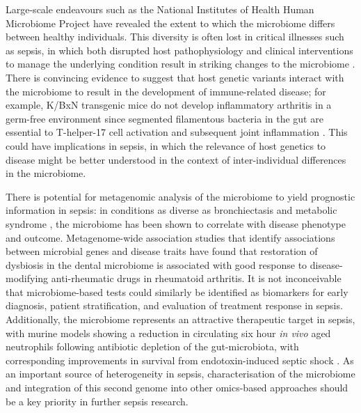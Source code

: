 Large-scale endeavours such as the National Institutes of Health Human Microbiome Project \parencite{Peterson2009} have revealed the extent to which the microbiome differs between healthy individuals. This diversity is often lost in critical illnesses such as sepsis, in which both disrupted host pathophysiology and clinical interventions to manage the underlying condition result in striking changes to the microbiome \parencite{Dickson2016}. There is convincing evidence to suggest that host genetic variants interact with the microbiome to result in the development of immune-related disease; for example, K/BxN transgenic mice do not develop inflammatory arthritis in a germ-free environment since segmented filamentous bacteria in the gut are essential to T-helper-17 cell activation and subsequent joint inflammation \parencite{Wu2010}. This could have implications in sepsis, in which the relevance of host genetics to disease might be better understood in the context of inter-individual differences in the microbiome.

There is potential for metagenomic analysis of the microbiome to yield prognostic information in sepsis: in conditions as diverse as bronchiectasis \parencite{Rogers2014} and metabolic syndrome \parencite{LeChatelier2013}, the microbiome has been shown to correlate with disease phenotype and outcome. Metagenome-wide association studies \parencite{Zhang2015} that identify associations between microbial genes and disease traits have found that restoration of dysbiosis in the dental microbiome is associated with good response to disease-modifying anti-rheumatic drugs in rheumatoid arthritis. It is not inconceivable that microbiome-based tests could similarly be identified as biomarkers for early diagnosis, patient stratification, and evaluation of treatment response in sepsis. Additionally, the microbiome represents an attractive therapeutic target in sepsis, with murine models showing a reduction in circulating six hour \textit{in vivo} aged neutrophils following antibiotic depletion of the gut-microbiota, with corresponding improvements in survival from endotoxin-induced septic shock \parencite{Zhang2015a}. As an important source of heterogeneity in sepsis, characterisation of the microbiome and integration of this second genome \parencite{Grice2012} into other omics-based approaches should be a key priority in further sepsis research.

